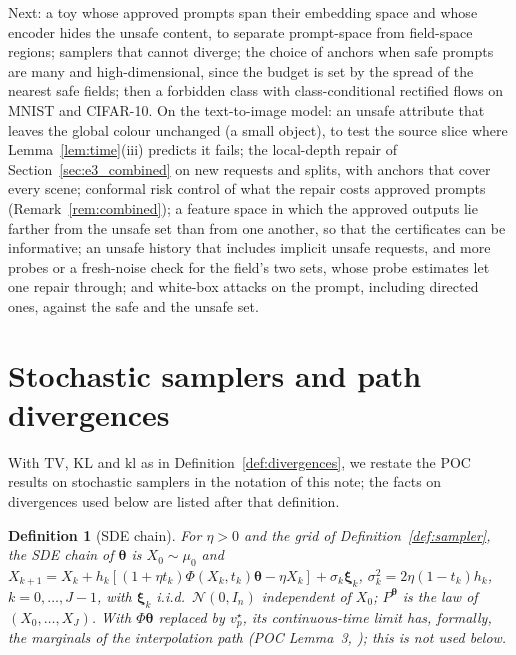 \documentclass{article}
\newcommand{\cN}{\mathcal{N}}
\newcommand{\bth}{\boldsymbol{\theta}}
\newcommand{\bxi}{\boldsymbol{\xi}}
\newcommand{\TV}{\mathrm{TV}}
\newcommand{\KL}{\mathrm{KL}}
\newcommand{\kl}{\mathrm{kl}}
\newcommand{\vstar}{v^{\star}}
\theoremstyle{plain}
\newtheorem{definition}[theorem]{Definition}
\theoremstyle{remark}
\begin{document}
Next: a toy whose approved prompts span their embedding space and whose encoder hides the unsafe content, to separate prompt-space
from field-space regions; samplers that cannot diverge; the choice of anchors when safe prompts are many and high-dimensional, since
the budget is set by the spread of the nearest safe fields; then a forbidden class with class-conditional rectified flows on MNIST and
CIFAR-10. On the text-to-image model: an unsafe attribute that leaves the global colour unchanged (a small object), to test the source
slice where Lemma~\ref{lem:time}(iii) predicts it fails; the local-depth repair of Section~\ref{sec:e3_combined} on new requests
and splits, with anchors that cover every scene; conformal risk control of what the repair costs approved prompts
(Remark~\ref{rem:combined}); a feature space in which the approved outputs lie farther from the
unsafe set than from one another, so that the certificates can be informative; an unsafe history that includes implicit unsafe
requests, and more probes or a fresh-noise check for the field's two sets, whose probe estimates let one repair through; and white-box
attacks on the prompt, including directed ones, against the safe and the unsafe set.

\appendix
\section{Stochastic samplers and path divergences}\label{app:sde}

With $\TV$, $\KL$ and $\kl$ as in Definition~\ref{def:divergences}, we restate the POC results on stochastic samplers in the
notation of this note; the facts on divergences used below are listed after that definition.

\begin{definition}[SDE chain]\label{def:sde}
For $\eta>0$ and the grid of Definition~\ref{def:sampler}, the SDE chain of $\bth$ is $X_0\sim\mu_0$ and
$X_{k+1}=X_k+h_k[(1+\eta t_k)\Phi(X_k,t_k)\bth-\eta X_k]+\sigma_k\bxi_k$, $\sigma_k^2=2\eta(1-t_k)h_k$, $k=0,\dots,J-1$, with
$\bxi_k$ i.i.d.\ $\cN(0,I_n)$ independent of $X_0$; $P^{\bth}$ is the law of $(X_0,\dots,X_J)$. With $\Phi\bth$ replaced by $\vstar_p$, its
continuous-time limit has, formally, the marginals of the interpolation path (POC Lemma~3,
\citealt{albergo2025stochastic}); this is not used below.
\end{definition}
\end{document}
